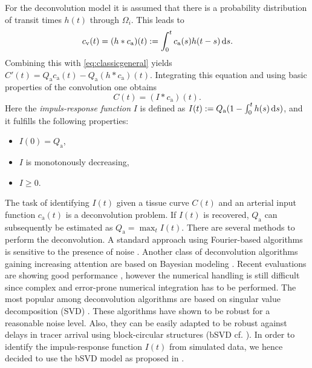 \documentclass[paper=a4, fontsize=11pt,parskip=half,headings=small]{scrartcl}
\newcommand{\ca}{c_\mathrm{a}}
\newcommand{\cout}{c_{\mathrm{v}}}
\newcommand{\Pa}{Q_{\mathrm{a}}}
\begin{document}
	For the deconvolution model it is assumed that there is a probability distribution of transit times $h(t)$ through $\Omega_i$. 
	This leads to
	\begin{equation}
		\cout(t) = (h*\ca)(t) := \int_0^t \ca(s) h(t-s) \diffint s.
	\end{equation}
	Combining this with \eqref{eq:classicgeneral} yields $C'(t) = \Pa\ca(t)-\Pa (h*\ca)(t)$.
	Integrating this equation and using basic properties of the convolution one obtains
	\begin{equation}
		C(t) = (I*\ca)(t).
		\label{eq:conv}
	\end{equation}
	Here the \emph{impuls-response function} $I$ is defined as $I(t) := \Pa(1-\int_0^t h(s) \diffint s)$, and it fulfills the following properties:
	\begin{itemize}
		\item $I(0) = \Pa$,
		\item $I$ is monotonously decreasing,
		\item $I\ge 0$.		
	\end{itemize}
	The task of identifying $I(t)$ given a tissue curve $C(t)$ and an arterial input function $\ca(t)$ is a deconvolution problem.
	If $I(t)$ is recovered, $\Pa$ can subsequently be estimated as $\Pa = \max_{t} I(t)$.
	There are several methods to perform the deconvolution.
	A standard approach using Fourier-based algorithms is sensitive to the presence of noise \cite{ostergaard96,wirestam00}.
	Another class of deconvolution algorithms gaining increasing attention are based on Bayesian modeling \cite{boutelier12,mouridsen06}.
	Recent evaluations are showing good performance \cite{sasaki13}, however the numerical handling is still difficult since complex and error-prone numerical integration has to be performed.
	The most popular among deconvolution algorithms are based on singular value decomposition (SVD) \cite{ostergaard96}.
	These algorithms have shown to be robust for a reasonable noise level.
	Also, they can be easily adapted to be robust against delays in tracer arrival using block-circular structures (bSVD cf. \cite{wu03}).
	In order to identify the impuls-response function $I(t)$ from simulated data, we hence decided to use the bSVD model as proposed in \cite{wu03}.

\end{document}
